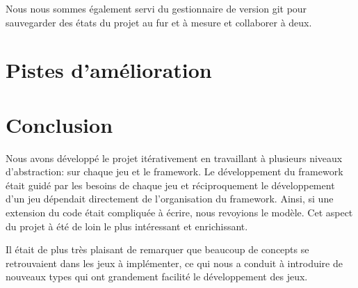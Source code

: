 \documentclass[a4paper, 11pt, DIV=9]{scrartcl}
\begin{document}
Nous nous sommes également servi du gestionnaire de version git pour sauvegarder
des états du projet au fur et à mesure et collaborer à deux.

\section{Pistes d'amélioration}


\section{Conclusion}

Nous avons développé le projet itérativement en travaillant à plusieurs niveaux
d'abstraction: sur chaque jeu et le framework. Le développement du framework
était guidé par les besoins de chaque jeu et réciproquement le développement
d'un jeu dépendait directement de l'organisation du framework. Ainsi, si une
extension du code était compliquée à écrire, nous revoyions le modèle. 
Cet aspect du projet à été de loin le plus intéressant et enrichissant.

Il était de plus très plaisant de remarquer que beaucoup de concepts se
retrouvaient dans les jeux à implémenter, ce qui nous a conduit à introduire de
nouveaux types qui ont grandement facilité le développement des jeux.
\end{document}
